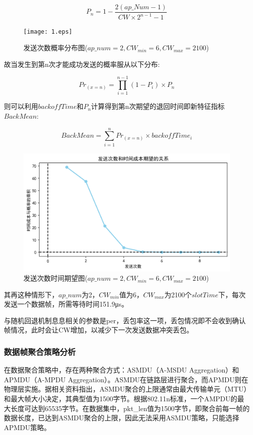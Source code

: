 \begin{equation}
	P_{n}=1-\frac{2(ap\_Num-1)}{CW\times 2^{n-1}-1}
\end{equation}

\begin{figure}[H]
	\centering
	\texttt{[image: 1.eps]}
	\caption{发送次数概率分布图($ap\_num=2,CW_{min}=6,CW_{max}=2100$)}
	\label{figure1}
\end{figure}


故当发生到第n次才能成功发送的概率服从以下分布:

\begin{equation}
	Pr_{(x=n)}=\prod_{i=1}^{n-1}{\left( 1-P_i \right) \times}P_n
\end{equation}

则可以利用$backoffTime$和$P_n$计算得到第n次期望的退回时间即新特征指标$BackMean$:

\begin{equation}
	BackMean=\sum_{i=1}^n{Pr_{(x=n)}\times backoffTime_i}
\end{equation}

\begin{figure}[H]
	\centering
	\includegraphics[width=0.75\linewidth]{figures/3}
	\caption{发送次数时间期望图($ap\_num=2,CW_{min}=6,CW_{max}=2100$)}
	\label{figure3}
\end{figure}

其再这种情形下，$ap\_num$为2，$CW_{min}$值为6，$CW_{max}$为2100个$slotTime$下，每次发送一个数据帧，所需等待时间151.9μs。

与随机回退机制息息相关的参数是per，丢包率这一项，丢包情况即不会收到确认帧情况，此时会让CW增加，以减少下一次发送数据冲突丢包。

\subsubsection{数据帧聚合策略分析}

在数据聚合策略中，存在两种聚合方式：ASMDU（A-MSDU Aggregation）和APMDU（A-MPDU Aggregation）。ASMDU在链路层进行聚合，而APMDU则在物理层实施。据相关资料指出，ASMDU聚合的上限通常由最大传输单元（MTU）和最大帧大小决定，其典型值为1500字节。根据802.11n标准，一个AMPDU的最大长度可达到65535字节。在数据集中，pkt\_len值为1500字节，即聚合前每一帧的数据长度，已达到ASMDU聚合的上限，因此无法采用ASMDU策略，只能选择APMDU策略。

